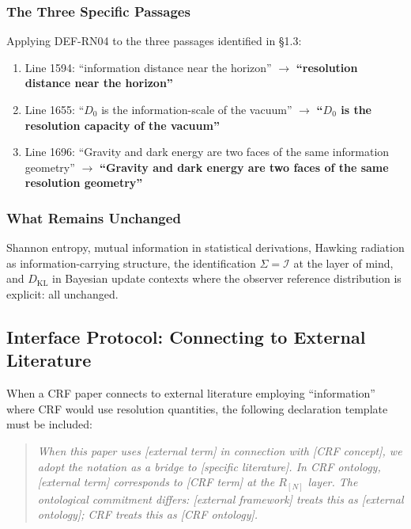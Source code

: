 \documentclass[12pt, a4paper]{article}
\begin{document}
\subsubsection{The Three Specific Passages}

Applying DEF-RN04 to the three passages identified in \S1.3:
\begin{enumerate}[leftmargin=*]
\item Line 1594: ``information distance near the horizon''
$\to$ \textbf{``resolution distance near the horizon''}
\item Line 1655: ``$D_0$ is the information-scale of the vacuum''
$\to$ \textbf{``$D_0$ is the resolution capacity of the vacuum''}
\item Line 1696: ``Gravity and dark energy are two faces of the
same information geometry''
$\to$ \textbf{``Gravity and dark energy are two faces of the
same resolution geometry''}
\end{enumerate}

\subsubsection{What Remains Unchanged}

Shannon entropy, mutual information in statistical derivations,
Hawking radiation as information-carrying structure, the
identification $\Sigma = \mathcal{I}$ at the layer of mind,
and $D_{\mathrm{KL}}$ in Bayesian update contexts where the
observer reference distribution is explicit: all unchanged.

\subsection{Interface Protocol: Connecting to External Literature}

\begin{formalbox}[title={DEF-RN05: Interface Protocol}]
When a CRF paper connects to external literature employing
``information'' where CRF would use resolution quantities,
the following declaration template must be included:

\medskip
\begin{quote}
\textit{When this paper uses [external term] in connection with
[CRF concept], we adopt the notation as a bridge to [specific
literature]. In CRF ontology, [external term] corresponds to
[CRF term] at the $R_{[N]}$ layer. The ontological commitment
differs: [external framework] treats this as [external ontology];
CRF treats this as [CRF ontology].}
\end{quote}
\end{formalbox}
\end{document}
